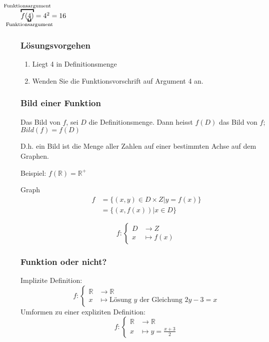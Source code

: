 \begin{multicols}{2}
	$\overbracket{
		f(\underbracket{4}_{\mathclap{\text{Funktionsargument}}})
	}^{\mathclap{\text{Funktionsargument}}}
	= 4^2 = 16$


\subsubsection{Lösungsvorgehen}
	\begin{enumerate}
		\item Liegt 4 in Definitionsmenge
		\item Wenden Sie die Funktionsvorschrift auf Argument 4 an.
	\end{enumerate}

\subsubsection{Bild einer Funktion}
	Das Bild von $f$, sei $D$ die Definitionsmenge.\newline
	Dann heisst $f(D)$ das Bild von $f$; $Bild(f)=f(D)$
	
	D.h. ein Bild ist die Menge aller Zahlen auf einer bestimmten Achse auf dem Graphen.
	
	Beispiel: $f(\mathbb{R}) = \mathbb{R}^+$
	
	
	Graph 
	\begin{align*}
		f &= \{(x,y) \in D \times Z | y=f(x)\} \\
		  &= \{(x,f(x))|x \in D\}
	\end{align*}
	
	\[
		f:
		\begin{cases}
			D &\to Z \\
			x &\mapsto f(x)
		\end{cases}
	\]


\subsubsection{Funktion oder nicht?}
	Implizite Definition: 
	\[ f :
		\begin{cases}
			\mathbb{R} &\to \mathbb{R} \\
			x & \mapsto \text{Lösung $y$ der Gleichung $2y-3=x$}
		\end{cases}
	\]
	Umformen zu einer expliziten Definition:
	\[ f :
		\begin{cases}
			\mathbb{R} &\to \mathbb{R} \\
			x & \mapsto y=\frac{x+3}{2}
		\end{cases}
	\]


\end{multicols}
